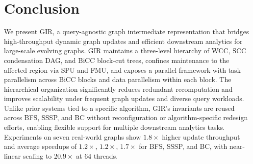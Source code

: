 \section{Conclusion}
\label{sec:conclusion}


We present GIR, a query-agnostic graph intermediate representation that bridges high-throughput dynamic graph updates and efficient downstream analytics for large-scale evolving graphs.
GIR maintains a three-level hierarchy of WCC, SCC condensation DAG, and BiCC block-cut trees, confines maintenance to the affected region via SPU and FMU, and exposes a parallel framework with task parallelism across BiCC blocks and data parallelism within each block. The hierarchical organization significantly reduces redundant recomputation and improves scalability under frequent graph updates and diverse query workloads.
Unlike prior systems tied to a specific algorithm, GIR's invariants are reused across BFS, SSSP, and BC without reconfiguration or algorithm-specific redesign efforts, enabling flexible support for multiple downstream analytics tasks.
Experiments on seven real-world graphs show $1.8\times$ higher update throughput and average speedups of $1.2\times$, $1.2\times$, $1.7\times$ for BFS, SSSP, and BC, with near-linear scaling to $20.9\times$ at 64 threads.







